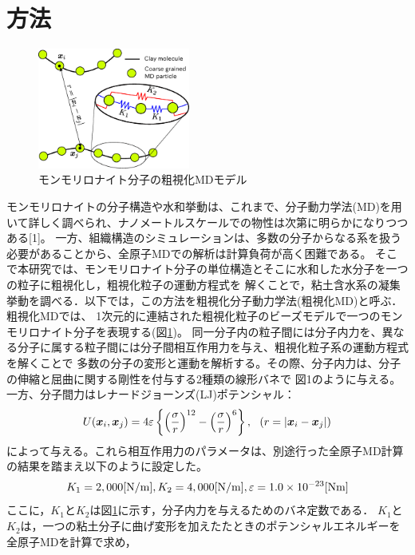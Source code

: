 ﻿\documentclass[11pt,a4j]{jarticle}
\begin{document}
\section{方法}
\begin{figure}
	\centering
	\includegraphics[keepaspectratio,width=50mm]{Figs/cg_model.eps}
	\caption{モンモリロナイト分子の粗視化MDモデル}
	\label{fig:fig1}
\end{figure}
モンモリロナイトの分子構造や水和挙動は、これまで、分子動力学法(MD)を用いて詳しく調べられ、ナノメートルスケールでの物性は次第に明らかになりつつある[1]。
一方、組織構造のシミュレーションは、多数の分子からなる系を扱う必要があることから、全原子MDでの解析は計算負荷が高く困難である。
そこで本研究では、モンモリロナイト分子の単位構造とそこに水和した水分子を一つの粒子に粗視化し，粗視化粒子の運動方程式を
解くことで，粘土含水系の凝集挙動を調べる．以下では，この方法を粗視化分子動力学法(粗視化MD)と呼ぶ．
粗視化MDでは、 1次元的に連結された粗視化粒子のビーズモデルで一つのモンモリロナイト分子を表現する(図\ref{fig:fig1})。
同一分子内の粒子間には分子内力を、異なる分子に属する粒子間には分子間相互作用力を与え、粗視化粒子系の運動方程式を解くことで
多数の分子の変形と運動を解析する。その際、分子内力は、分子の伸縮と屈曲に関する剛性を付与する2種類の線形バネで
図1のように与える。一方、分子間力はレナードジョーンズ(LJ)ポテンシャル：
\begin{equation}
	U(\mbox{\boldmath $x$}_i,\mbox{\boldmath $x$}_j)=4\varepsilon
	\left\{ \left(\frac{\sigma}{r}\right)^{12}-
	\left( \frac{\sigma}{r}\right)^6\right\}, 
	\ \ \left(r=\left| \mbox{\boldmath $x$}_i-\mbox{\boldmath $x$}_j\right|\right)
	\label{eqn:LJ}
\end{equation}
によって与える。これら相互作用力のパラメータは、別途行った全原子MD計算の結果を踏まえ以下のように設定した。
\begin{equation}
	K_1  = 2,000[{\rm N / m}],   K_2  = 4,000[{\rm N / m}],  \varepsilon = 1.0\times10^{-23}     [{\rm Nm}]
	\label{eqn:prms}
\end{equation}
ここに，$K_1$と$K_2$は図\ref{fig:fig1}に示す，分子内力を与えるためのバネ定数である．
$K_1$と$K_2$は，一つの粘土分子に曲げ変形を加えたたときのポテンシャルエネルギーを全原子MDを計算で求め，
\end{document}
